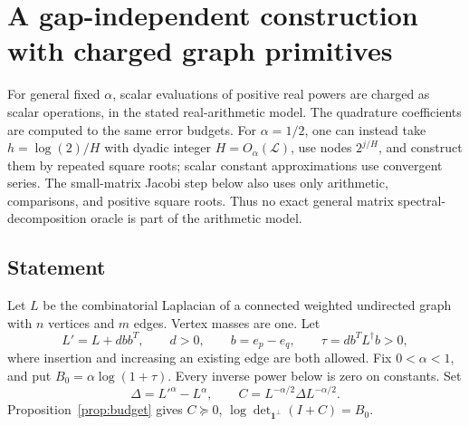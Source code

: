 \section{A gap-independent construction with charged graph primitives}\label{alg:sec:algorithm}
For general fixed $\alpha$, scalar evaluations of positive real powers
are charged as scalar operations, in the stated real-arithmetic model.
The quadrature coefficients are computed to the same error budgets.
For $\alpha=1/2$, one can instead take $h=\log(2)/H$ with dyadic integer
$H=O_\alpha(\mathcal L)$, use nodes $2^{j/H}$, and construct them by
repeated square roots; scalar constant approximations use convergent
series. The small-matrix Jacobi step below also uses only arithmetic,
comparisons, and positive square roots. Thus no exact general matrix
spectral-decomposition oracle is part of the arithmetic model.

\subsection{Statement}
Let $L$ be the combinatorial Laplacian of a connected weighted undirected
graph with $n$ vertices and $m$ edges. Vertex masses are one. Let
\[
 L'=L+d b b^T,\qquad d>0,\qquad b=e_p-e_q,\qquad
 \tau=d b^TL^\dagger b>0,
\]
where insertion and increasing an existing edge are both allowed.
Fix $0<\alpha<1$, and put $B_0=\alpha\log(1+\tau)$.
Every inverse power below is zero on constants. Set
\[
 \Delta=L'^\alpha-L^\alpha,\qquad
 C=L^{-\alpha/2}\Delta L^{-\alpha/2}.
\]
Proposition~\ref{prop:budget} gives
$C\succeq0$, $\log\det_{\mathbf1^\perp}(I+C)=B_0$.

